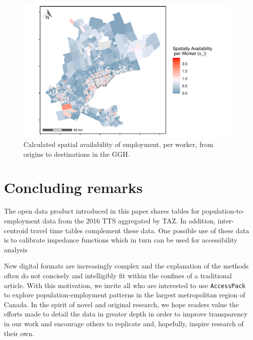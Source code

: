 \documentclass[Royal,times,sageh]{sagej}
\begin{document}
\begin{figure}
\includegraphics[width=1\linewidth]{Manuscript-Data-Package_files/figure-latex/plot-avail-GGH-TTS-per-worker-1} \caption{\label{fig:plot-avail-GGH-TTS-per-worker}Calculated spatial availability of employment, per worker, from origins to destinations in the GGH.}\label{fig:plot-avail-GGH-TTS-per-worker}
\end{figure}

\newpage

\hypertarget{concluding-remarks}{%
\section{Concluding remarks}\label{concluding-remarks}}

The open data product introduced in this paper shares tables for
population-to-employment data from the 2016 TTS aggregated by TAZ. In
addition, inter-centroid travel time tables complement these data. One
possible use of these data is to calibrate impedance functions which in
turn can be used for accessibility analysis

New digital formats are increasingly complex and the explanation of the
methods often do not concisely and intelligibly fit within the confines
of a traditional article. With this motivation, we invite all who are
interested to use \texttt{AccessPack} to explore population-employment
patterns in the largest metropolitan region of Canada. In the spirit of
novel and original research, we hope readers value the efforts made to
detail the data in greater depth in order to improve transparency in our
work and encourage others to replicate and, hopefully, inspire research
of their own.

\newpage



\end{document}
